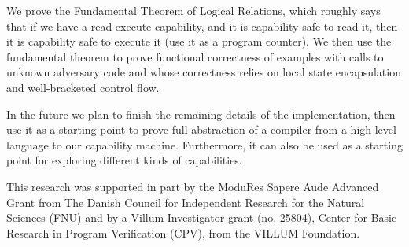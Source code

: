 \documentclass[sigplan,review]{acmart}\settopmatter{printfolios=true,printccs=false,printacmref=false}
\begin{document}



We prove the Fundamental Theorem of Logical Relations, which roughly says that if we have a read-execute capability, and it is capability safe to read it, then it is capability safe to execute it (use it as a program counter).
We then use the fundamental theorem to prove functional correctness of examples with calls to unknown adversary code and whose correctness relies on local state encapsulation and well-bracketed control flow.

In the future we plan to finish the remaining details of the implementation, then use it as a starting point to prove full abstraction of a compiler from a high level language to our capability machine. Furthermore, it can also be used as a starting point for exploring different kinds of capabilities. 

\begin{acks}                            %

  This research was supported in part by the ModuRes Sapere Aude Advanced Grant from The Danish Council for Independent Research for the Natural Sciences (FNU) and by a Villum Investigator grant (no.
  25804), Center for Basic Research in Program Verification (CPV), from the VILLUM Foundation.
  
\end{acks}






\end{document}
